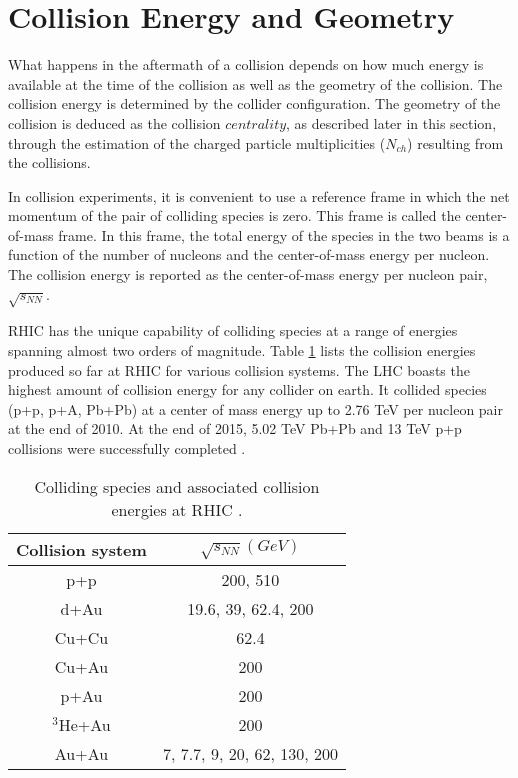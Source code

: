 \section{Collision Energy and Geometry}\label{geometry}
What happens in the aftermath of a collision depends on how much energy is available at the time of the collision as well as the geometry of the collision. The collision energy is determined by the collider configuration. The geometry of the collision is deduced as the collision $centrality$, as described later in this section, through the estimation of the charged particle multiplicities ($N_{ch}$) resulting from the collisions.  

In collision experiments, it is convenient to use a reference frame in which the net momentum of the pair of colliding species is zero. This frame is called the center-of-mass frame. In this frame, the total energy of the species in the two beams is a function of the number of nucleons and the center-of-mass energy per nucleon. The collision energy is reported as the center-of-mass energy per nucleon pair, $\sqrt{s_{NN}}$. %


RHIC has the unique capability of colliding species at a range of energies spanning almost two orders of magnitude. Table \ref{table:RHIC_specs} lists the collision energies produced so far at RHIC for various collision systems. The LHC boasts the highest amount of collision energy for any collider on earth. It collided species (p+p, p+A, Pb+Pb) at a center of mass energy up to 2.76 TeV per nucleon pair at the end of 2010. At the end of 2015, 5.02 TeV Pb+Pb and 13 TeV p+p collisions were successfully completed \cite{FOKA2016154}.

\begin{table}[!b]
\centering
\caption{Colliding species and associated collision energies at RHIC \cite{McGlincheyPrivateCommunication}.}
\begin{tabular}{||c c||}
\hline
Collision system & $\sqrt{s_{NN}}(GeV)$ \\ [0.5ex]
\hline
\hline
p+p & 200, 510 \\
d+Au & 19.6, 39, 62.4, 200 \\
Cu+Cu & 62.4 \\
Cu+Au &  200 \\
p+Au & 200 \\
$^3$He+Au & 200 \\
Au+Au & 7, 7.7, 9, 20, 62, 130, 200 \\ [1ex]
\hline
\end{tabular}
\label{table:RHIC_specs}
\end{table}


